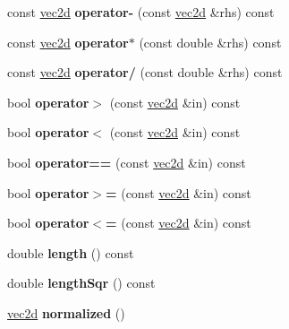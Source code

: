 \begin{DoxyCompactItemize}
\item 
\hypertarget{classvec2d_a71781caa50e7be31fcac3eb3b2c18fde}{
const \hyperlink{classvec2d}{vec2d} {\bfseries operator-\/} (const \hyperlink{classvec2d}{vec2d} \&rhs) const }
\label{classvec2d_a71781caa50e7be31fcac3eb3b2c18fde}

\item 
\hypertarget{classvec2d_a52018399c3cca0d9c07303a32e15883a}{
const \hyperlink{classvec2d}{vec2d} {\bfseries operator$\ast$} (const double \&rhs) const }
\label{classvec2d_a52018399c3cca0d9c07303a32e15883a}

\item 
\hypertarget{classvec2d_a2533375f29699c7adeeaa7715b337c47}{
const \hyperlink{classvec2d}{vec2d} {\bfseries operator/} (const double \&rhs) const }
\label{classvec2d_a2533375f29699c7adeeaa7715b337c47}

\item 
\hypertarget{classvec2d_a535c52464172ff2dd220c990a059570c}{
bool {\bfseries operator$>$} (const \hyperlink{classvec2d}{vec2d} \&in) const }
\label{classvec2d_a535c52464172ff2dd220c990a059570c}

\item 
\hypertarget{classvec2d_ae714b9a78dc683bc9a6c237702e26200}{
bool {\bfseries operator$<$} (const \hyperlink{classvec2d}{vec2d} \&in) const }
\label{classvec2d_ae714b9a78dc683bc9a6c237702e26200}

\item 
\hypertarget{classvec2d_ae8a2bc610b13e20f181da722b1755e79}{
bool {\bfseries operator==} (const \hyperlink{classvec2d}{vec2d} \&in) const }
\label{classvec2d_ae8a2bc610b13e20f181da722b1755e79}

\item 
\hypertarget{classvec2d_a59406dffad7c4acd494446b4d0c9fac3}{
bool {\bfseries operator$>$=} (const \hyperlink{classvec2d}{vec2d} \&in) const }
\label{classvec2d_a59406dffad7c4acd494446b4d0c9fac3}

\item 
\hypertarget{classvec2d_a42ff3d796e7705dc4f1c16a618c174eb}{
bool {\bfseries operator$<$=} (const \hyperlink{classvec2d}{vec2d} \&in) const }
\label{classvec2d_a42ff3d796e7705dc4f1c16a618c174eb}

\item 
\hypertarget{classvec2d_a5efec4470db738f67661cbc4dd778803}{
double {\bfseries length} () const }
\label{classvec2d_a5efec4470db738f67661cbc4dd778803}

\item 
\hypertarget{classvec2d_ad8ddec33eb3a63166d8b0d0a2dc10ed9}{
double {\bfseries lengthSqr} () const }
\label{classvec2d_ad8ddec33eb3a63166d8b0d0a2dc10ed9}

\item 
\hypertarget{classvec2d_a1706997c380f8de1baed1f1239ee42b8}{
\hyperlink{classvec2d}{vec2d} {\bfseries normalized} ()}
\label{classvec2d_a1706997c380f8de1baed1f1239ee42b8}

\end{DoxyCompactItemize}
